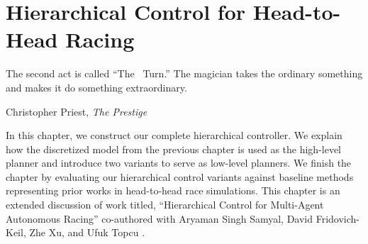 \chapter{Hierarchical Control for Head-to-Head Racing} 
\epigraph{\flushright The second act is called ``The~ Turn.'' The magician takes the ordinary something and makes it do something extraordinary.}{Christopher Priest, \textit{The Prestige}}
\label{chapter:hier}
In this chapter, we construct our complete hierarchical controller. We explain how the discretized model from the previous chapter is used as the high-level planner and introduce two variants to serve as low-level planners. We finish the chapter by evaluating our hierarchical control variants against baseline methods representing prior works in head-to-head race simulations. This chapter is an extended discussion of work titled, ``Hierarchical Control for Multi-Agent Autonomous Racing'' co-authored with Aryaman Singh Samyal, David Fridovich-Keil, Zhe Xu, and Ufuk Topcu \cite{thakkarprior1}.
